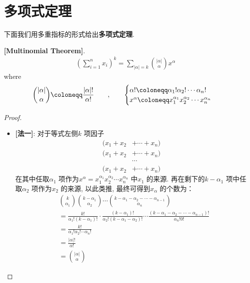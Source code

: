 \section{多项式定理}
	下面我们用多重指标的形式给出\textbf{多项式定理}.
	\begin{thm}\label{thm 1.2.1}
		\textbf{[Multinomial Theorem]}. 
		\begin{align}
			\left( \sum_{i = 1}^{n} x_i \right)^k = \sum_{\left| \alpha \right| = k} 
			{\left| \alpha \right| \choose \alpha}
			x^{\alpha}
		\end{align}
		where
		\begin{align}
			{\left| \alpha \right| \choose \alpha}
			\coloneqq \frac{\left| \alpha \right| !}{\alpha !} 
			\hspace*{2em} , \hspace*{2em}  
			\begin{cases}
				\alpha ! \coloneqq \alpha_1 ! \alpha_2 ! \cdots \alpha_n ! \\
				x^{\alpha} \coloneqq x_{1}^{\alpha_1} x_{2}^{\alpha_2} \cdots x_{n}^{\alpha_n}
			\end{cases}
		\end{align}
	
		\vspace{4em}
		
		\begin{proof}
			\begin{itemize}
				\item \textbf{[法一]}: 对于等式左侧$k$ 项因子
				\begin{align}
					(x_1 + x_2 &+ \cdots + x_n) \\
					(x_1 + x_2 &+ \cdots + x_n) \\
					&\cdots \\
					(x_1 + x_2 &+ \cdots + x_n)
				\end{align}
				在其中任取$\alpha_1$ 项作为$x^{\alpha} = x_{1}^{\alpha_1} x_{2}^{\alpha_2} \cdots x_{n}^{\alpha_n}$ 中$x_1$ 的来源. 再在剩下的$k - \alpha_1$ 项中任取$\alpha_2$ 项作为$x_2$ 的来源, 以此类推, 最终可得到$x_\alpha$ 的个数为：
				\begin{align}
					&{k \choose \alpha_1} 
					{k - \alpha_1 \choose \alpha_2} 
					\cdots 
					{k - \alpha_1 - \alpha_2 - \cdots - \alpha_{n - 1} \choose \alpha_n} \\
					&= \frac{k!}{\alpha_1 ! (k - \alpha_1) !} 
					\cdot
					\frac{(k - \alpha_1) !}{\alpha_2 ! (k - \alpha_1 - \alpha_2) !} 
					\cdots
					\frac{(k - \alpha_1 - \alpha_2 - \cdots - \alpha_{n - 1}) !}{\alpha_n ! 0 !} \\
					&= \frac{k !}{\alpha_1 ! \alpha_2 ! \cdots \alpha_n !} \\
					&= \frac{\left| \alpha \right| !}{\alpha !} \\
					&= {\left| \alpha \right| \choose \alpha}
				\end{align} 
			

\end{itemize}
\end{proof}
\end{thm}
